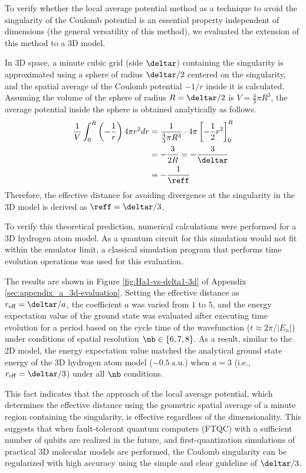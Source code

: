 \documentclass[manuscript_main.tex]{subfiles}
\begin{document}
To verify whether the local average potential method as a technique to avoid the
singularity of the Coulomb potential is an essential property independent of
dimensions (the general versatility of this method), we evaluated the extension
of this method to a 3D model.

In 3D space, a minute cubic grid (side $\deltar$) containing the singularity is
approximated using a sphere of radius $\deltar/2$ centered on the singularity,
and the spatial average of the Coulomb potential $-1/r$ inside it is calculated.
Assuming the volume of the sphere of radius $R = \deltar/2$ is $V =
\frac{4}{3}\pi R^3$, the average potential inside the sphere is obtained
analytically as follows.
\begin{align}
    \frac{1}{V} \int_{0}^{R} \left(-\frac{1}{r}\right) 4\pi r^2 dr 
    &= \frac{1}{\frac{4}{3}\pi R^3} \cdot 4\pi
      \left[ -\frac{1}{2}r^2 \right]_{0}^{R} \\
    &= -\frac{3}{2R} = -\frac{3}{\deltar} \notag \\
    &= -\frac{1}{\reff}
\end{align}
Therefore, the effective distance for avoiding divergence at the singularity in
the 3D model is derived as $\reff = \deltar/3$.

To verify this theoretical prediction, numerical calculations were performed for
a 3D hydrogen atom model. As a quantum circuit for this simulation would not
fit within the emulator limit, a classical simulation program that performs time
evolution operations was used for this evaluation.

The results are shown in Figure \ref{fig:Ha1-vs-delta1-3d} of Appendix
\ref{sec:appendix_a_3d-evaluation}. Setting the effective distance as
$r_{\mathrm{eff}} = \deltar/a$, the coefficient $a$ was varied from $1$ to $5$,
and the energy expectation value of the ground state was evaluated after
executing time evolution for a period based on the cycle time of the
wavefunction ($t\approx 2\pi/|E_n|$) under conditions of spatial resolution $\nb
\in \{6, 7, 8\}$. As a result, similar to the 2D model, the energy expectation
value matched the analytical ground state energy of the 3D hydrogen atom model
($-0.5\ \mathrm{a.u.}$) when $a=3$ (i.e., $r_{\mathrm{eff}} = \deltar/3$) under
all $\nb$ conditions.

This fact indicates that the approach of the local average potential, which
determines the effective distance using the geometric spatial average of a minute
region containing the singularity, is effective regardless of the
dimensionality. This suggests that when fault-tolerant quantum computers (FTQC)
with a sufficient number of qubits are realized in the future, and
first-quantization simulations of practical 3D molecular models are performed,
the Coulomb singularity can be regularized with high accuracy using the simple
and clear guideline of $\deltar/3$.
\end{document}

